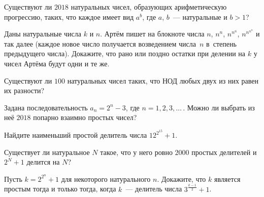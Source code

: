


\begin{problems}

\item
Существуют ли $2018$ натуральных чисел, образующих арифметическую прогрессию,
таких, что каждое имеет вид $a^{b}$, где $a$, $b$~--- натуральные и $b > 1$?

\item
Даны натуральные числа $k$ и $n$.
Артём пишет на блокноте числа $n$, $n^{n}$, $n^{n^{n}}$, $n^{n^{n^{n}}}$
и так далее (каждое новое число получается возведением числа~$n$ в~степень
предыдущего числа).
Докажите, что рано или поздно остатки при делении на $k$ у чисел Артёма будут
одни и те же.

\item
Существуют ли $100$ натуральных чисел таких, что НОД любых двух из них равен их
разности?

\item
Задана последовательность $a_{n} = 2^{n} - 3$, где $n = 1, 2, 3, \ldots$\,.
Можно ли выбрать из неё $2018$ попарно взаимно простых чисел?

\item
Найдите наименьший простой делитель числа $12^{2^{15}} + 1$.

\item
Существует ли натуральное $N$ такое, что у него ровно $2000$ простых делителей
и $2^{N} + 1$ делится на $N$?

\item
Пусть $k = 2^{2^{n}} + 1$ для некоторого натурального $n$.
Докажите, что $k$ является простым тогда и только тогда, когда $k$~--- делитель
числа $3^{\frac{k-1}{2}} + 1$.

\end{problems}

